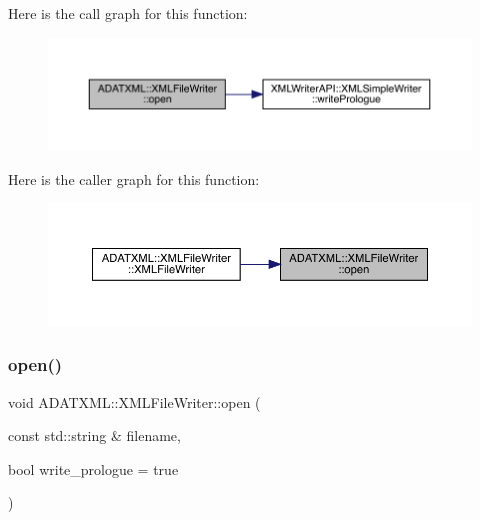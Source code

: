 Here is the call graph for this function\+:
\nopagebreak
\begin{figure}[H]
\begin{center}
\leavevmode
\includegraphics[width=350pt]{d6/ddb/classADATXML_1_1XMLFileWriter_a76f52e7ccdfe3b82875f30953cfd2447_cgraph}
\end{center}
\end{figure}
Here is the caller graph for this function\+:\nopagebreak
\begin{figure}[H]
\begin{center}
\leavevmode
\includegraphics[width=350pt]{d6/ddb/classADATXML_1_1XMLFileWriter_a76f52e7ccdfe3b82875f30953cfd2447_icgraph}
\end{center}
\end{figure}
\mbox{\label{classADATXML_1_1XMLFileWriter_a76f52e7ccdfe3b82875f30953cfd2447}} 
\subsubsection{\texorpdfstring{open()}{open()}\hspace{0.1cm}{\footnotesize\ttfamily [2/2]}}
{\footnotesize\ttfamily void A\+D\+A\+T\+X\+M\+L\+::\+X\+M\+L\+File\+Writer\+::open (\begin{DoxyParamCaption}\item[{const std\+::string \&}]{filename,  }\item[{bool}]{write\+\_\+prologue = {\ttfamily true} }\end{DoxyParamCaption})\hspace{0.3cm}{\ttfamily [inline]}}

